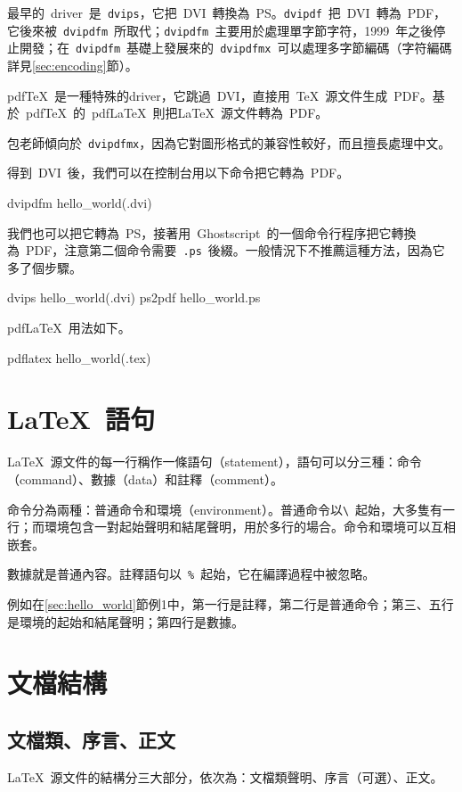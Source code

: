 最早的~driver~是~\verb|dvips|，它把~DVI~轉換為~PS。\verb|dvipdf|~把~DVI~轉為~PDF，它後來被~\verb|dvipdfm|~所取代；\verb|dvipdfm|~主要用於處理單字節字符，1999~年之後停止開發；在~\verb|dvipdfm|~基礎上發展來的~\verb|dvipdfmx|~可以處理多字節編碼（字符編碼詳見\ref{sec:encoding}節）。

pdf\TeX~是一種特殊的driver，它跳過~DVI，直接用~\TeX~源文件生成~PDF。基於~pdf\TeX~的~pdf\LaTeX~則把\LaTeX~源文件轉為~PDF。

包老師傾向於~\verb|dvipdfmx|，因為它對圖形格式的兼容性較好，而且擅長處理中文。

得到~DVI~後，我們可以在控制台用以下命令把它轉為~PDF。
\begin{code}
dvipdfm hello_world(.dvi)
\end{code}

我們也可以把它轉為~PS，接著用~Ghostscript~的一個命令行程序把它轉換為~PDF，注意第二個命令需要~\verb|.ps|~後綴。一般情況下不推薦這種方法，因為它多了個步驟。
\begin{code}
dvips hello_world(.dvi)
ps2pdf hello_world.ps
\end{code}

pdf\LaTeX~用法如下。
\begin{code}
pdflatex hello_world(.tex)
\end{code}

\section{\LaTeX~語句}
\LaTeX~源文件的每一行稱作一條語句（statement），語句可以分三種：命令（command）、數據（data）和註釋（comment）。

命令分為兩種：普通命令和環境（environment）。普通命令以\verb|\|~起始，大多隻有一行；而環境包含一對起始聲明和結尾聲明，用於多行的場合。命令和環境可以互相嵌套。

數據就是普通內容。註釋語句以~\verb|%|~起始，它在編譯過程中被忽略。

例如在\ref{sec:hello_world}節例1中，第一行是註釋，第二行是普通命令；第三、五行是環境的起始和結尾聲明；第四行是數據。

\section{文檔結構}
\subsection{文檔類、序言、正文}
\LaTeX~源文件的結構分三大部分，依次為：文檔類聲明、序言（可選）、正文。

